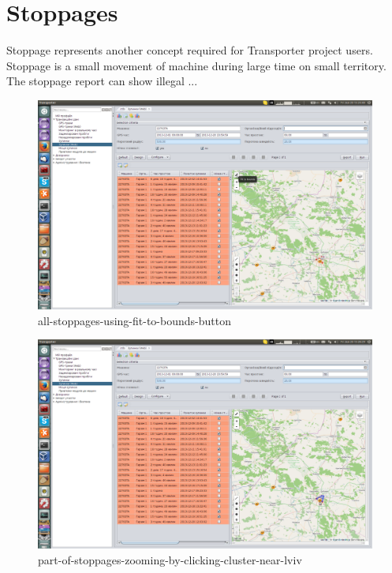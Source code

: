 \section{Stoppages}

Stoppage represents another concept required for Transporter project users. Stoppage is a small movement of machine during large time on small territory. The stoppage report can show illegal ... 

\begin{figure}[H]
\centering
\includegraphics[width=\linewidth]{chapters/03-stoppages/images/21-all-stoppages-using-fit-to-bounds-button.png}
\caption{all-stoppages-using-fit-to-bounds-button}\label{fig:21}
\end{figure}

\begin{figure}[H]
\centering
\includegraphics[width=\linewidth]{chapters/03-stoppages/images/22-part-of-stoppages-zooming-by-clicking-cluster-near-lviv.png}
\caption{part-of-stoppages-zooming-by-clicking-cluster-near-lviv}\label{fig:22}
\end{figure}

